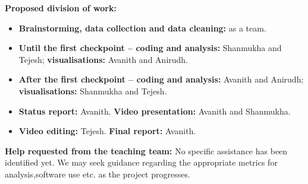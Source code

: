\documentclass[10pt,a4paper]{article}
\begin{document}
\textbf{Proposed division of work:}
\begin{itemize}
  \item \textbf{Brainstorming, data collection and data cleaning:} as a team.
  \item \textbf{Until the first checkpoint -- coding and analysis:} Shanmukha and Tejesh; \textbf{visualisations:} Avanith and Anirudh.
  \item \textbf{After the first checkpoint -- coding and analysis:} Avanith and Anirudh; \textbf{visualisations:} Shanmukha and Tejesh.
  \item \textbf{Status report:} Avanith. \quad
  \textbf{Video presentation:} Avanith and Shanmukha.
  \item \textbf{Video editing:} Tejesh. \quad
  \textbf{Final report:} Avanith.
\end{itemize}

\textbf{Help requested from the teaching team:} No specific assistance has been identified yet. We may seek guidance regarding the appropriate metrics for analysis,software use etc. as the project progresses.
\end{document}
